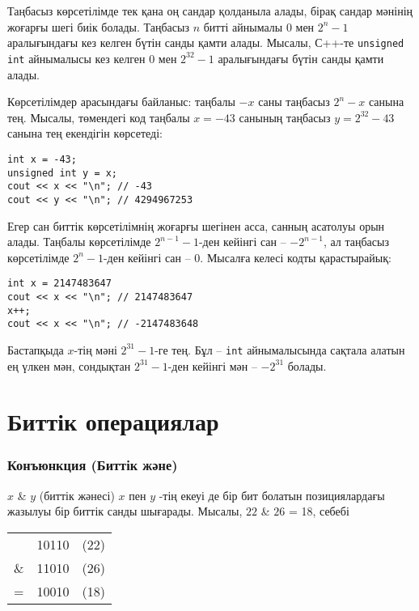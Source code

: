 Таңбасыз көрсетілімде тек қана оң сандар қолданыла алады,
бірақ сандар мәнінің жоғарғы шегі биік болады.
Таңбасыз $n$ битті айнымалы $0$ мен $2^n-1$ 
аралығындағы кез келген бүтін санды қамти алады.
Мысалы, С++-те \texttt{unsigned int} айнымалысы кез келген 
$0$ мен $2^{32}-1$ аралығындағы бүтін санды қамти алады.

Көрсетілімдер арасындағы байланыс:
таңбалы $-x$ саны таңбасыз $2^n-x$ санына тең.
Мысалы, төмендегі код таңбалы $x=-43$ санының 
таңбасыз $y=2^{32}-43$ санына тең екендігін көрсетеді:
\begin{lstlisting}
int x = -43;
unsigned int y = x;
cout << x << "\n"; // -43
cout << y << "\n"; // 4294967253
\end{lstlisting}

Егер сан биттік көрсетілімнің жоғарғы шегінен асса,
санның асатолуы орын алады. 
Таңбалы көрсетілімде $2^{n-1}-1$-ден кейінгі сан -- $-2^{n-1}$,
ал таңбасыз көрсетілімде $2^n-1$-ден кейінгі сан -- $0$.
Мысалға келесі кодты қарастырайық:
\begin{lstlisting}
int x = 2147483647
cout << x << "\n"; // 2147483647
x++;
cout << x << "\n"; // -2147483648
\end{lstlisting}

Бастапқыда $x$-тің мәні $2^{31}-1$-ге тең.
Бұл -- \texttt{int} айнымалысында сақтала 
алатын ең үлкен мән, сондықтан $2^{31}-1$-ден
кейінгі мән -- $-2^{31}$ болады.

\section{Биттік операциялар}

\newcommand\XOR{\mathbin{\char`\^}}

\subsubsection{Конъюнкция (Биттік және)} 


$x$ \& $y$  (биттік жәнесі) $x$ пен $y$ -тің екеуі де бір бит болатын
позициялардағы жазылуы бір биттік санды шығарады.
Мысалы, $22$ \& $26$ = 18, себебі

\begin{center}
\begin{tabular}{rrr}
& 10110 & (22)\\
\& & 11010 & (26) \\
\hline
 = & 10010 & (18) \\
\end{tabular}
\end{center}

